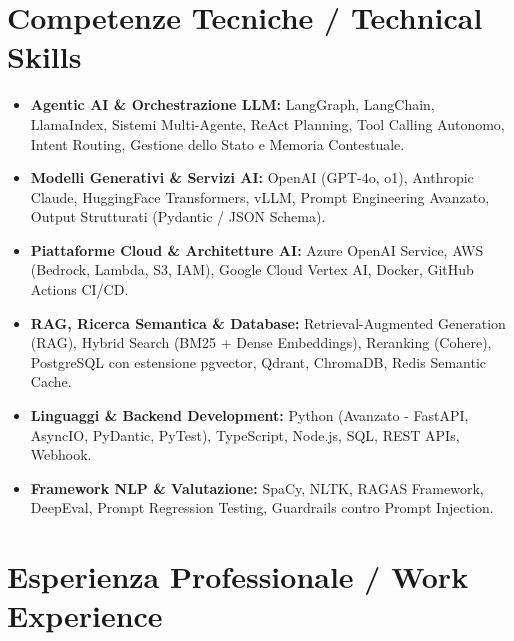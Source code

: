 \documentclass[a4paper,10pt]{article}
\begin{document}
\section{Competenze Tecniche / Technical Skills}
\begin{itemize}[leftmargin=1.2em, itemsep=2pt]
  \item \textbf{Agentic AI \& Orchestrazione LLM:} LangGraph, LangChain, LlamaIndex, Sistemi Multi-Agente, ReAct Planning, Tool Calling Autonomo, Intent Routing, Gestione dello Stato e Memoria Contestuale.
  \item \textbf{Modelli Generativi \& Servizi AI:} OpenAI (GPT-4o, o1), Anthropic Claude, HuggingFace Transformers, vLLM, Prompt Engineering Avanzato, Output Strutturati (Pydantic / JSON Schema).
  \item \textbf{Piattaforme Cloud \& Architetture AI:} Azure OpenAI Service, AWS (Bedrock, Lambda, S3, IAM), Google Cloud Vertex AI, Docker, GitHub Actions CI/CD.
  \item \textbf{RAG, Ricerca Semantica \& Database:} Retrieval-Augmented Generation (RAG), Hybrid Search (BM25 + Dense Embeddings), Reranking (Cohere), PostgreSQL con estensione pgvector, Qdrant, ChromaDB, Redis Semantic Cache.
  \item \textbf{Linguaggi \& Backend Development:} Python (Avanzato - FastAPI, AsyncIO, PyDantic, PyTest), TypeScript, Node.js, SQL, REST APIs, Webhook.
  \item \textbf{Framework NLP \& Valutazione:} SpaCy, NLTK, RAGAS Framework, DeepEval, Prompt Regression Testing, Guardrails contro Prompt Injection.
\end{itemize}

\section{Esperienza Professionale / Work Experience}
\end{document}
